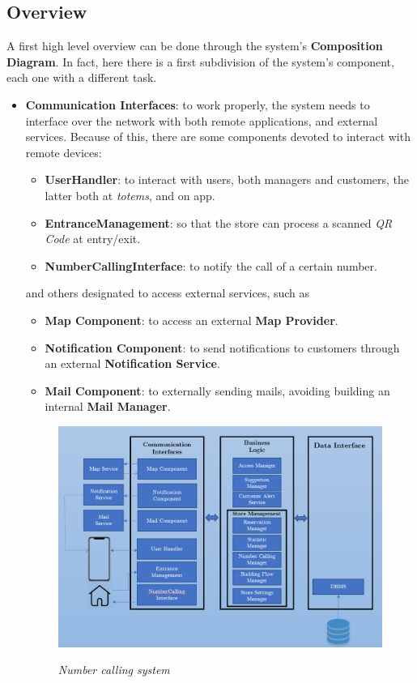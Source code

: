 \documentclass{article}
\begin{document}
	\subsection{Overview}
	A first high level overview can be done through the system's \textbf{Composition Diagram}. In fact, here there is a first subdivision of the system's component, each one with a different task.
	\begin{itemize}
		\item \textbf{Communication Interfaces}: to work properly, the system needs to interface over the network with both remote applications, and external services. Because of this, there are some components devoted to interact with remote devices:
		\begin{itemize}
			\item{\bfseries UserHandler}: to interact with users, both managers and customers, the latter both at \emph{totems}, and on app.
			\item{\bfseries EntranceManagement}: so that the store can process a scanned \emph{QR Code} at entry/exit.
			\item{\bfseries NumberCallingInterface}: to notify the call of a certain number.
		\end{itemize}
		and others designated to access external services, such as 
		\begin{itemize}
			\item{\bfseries Map Component}: to access an external {\bfseries Map Provider}.
			\item{\bfseries Notification Component}: to send notifications to customers through an external {\bfseries Notification Service}.
			\item{\bfseries Mail Component}: to externally sending mails, avoiding building an internal {\bfseries Mail Manager}.
		\end{itemize}
	\begin{figure}[!h]
		\begin{adjustwidth}{-0.8cm}{}
			\centering
			\includegraphics[scale=0.5]{../UML Diagrams/CompositionDiagram/CompositionDiagram.png} \\
		\end{adjustwidth}
		\caption{\emph{Number calling system}}
	\end{figure}
	

\end{itemize}
\end{document}

